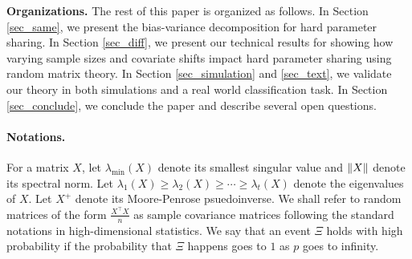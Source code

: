 \smallskip
\noindent\textbf{Organizations.}
The rest of this paper is organized as follows.
In Section \ref{sec_same}, we present the bias-variance decomposition for hard parameter sharing.
In Section \ref{sec_diff}, we present our technical results for showing how varying sample sizes and covariate shifts impact hard parameter sharing using random matrix theory.
In Section \ref{sec_simulation} and \ref{sec_text}, we validate our theory in both simulations and a real world classification task.
In Section \ref{sec_conclude}, we conclude the paper and describe several open questions.

\paragraph{Notations.}
For a matrix $X$, let $\lambda_{\min}(X)$ denote its smallest singular value and $\|X\|$ denote its spectral norm.
Let $\lambda_1(X) \ge \lambda_2(X) \ge \cdots \ge \lambda_t(X)$ denote the eigenvalues of $X$.
Let $X^+$ denote its Moore-Penrose psuedoinverse.
We shall refer to random matrices of the form $\frac {X^\top X} n$ as sample covariance matrices following the standard notations in high-dimensional statistics.
We say that an event $\Xi$ holds with high probability if the probability that $\Xi$ happens goes to $1$ as $p$ goes to infinity.
